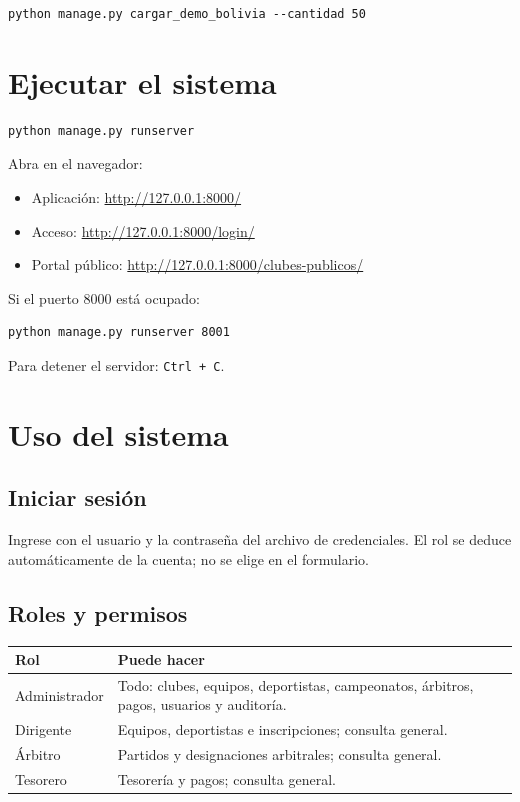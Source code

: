 \documentclass[11pt,a4paper]{article}
\newcommand{\campo}[1]{\texttt{\small #1}}
\begin{document}
\begin{lstlisting}
python manage.py cargar_demo_bolivia --cantidad 50
\end{lstlisting}

\section{Ejecutar el sistema}

\begin{lstlisting}
python manage.py runserver
\end{lstlisting}

Abra en el navegador:

\begin{itemize}[leftmargin=1.4em]
  \item Aplicación: \url{http://127.0.0.1:8000/}
  \item Acceso: \url{http://127.0.0.1:8000/login/}
  \item Portal público: \url{http://127.0.0.1:8000/clubes-publicos/}
\end{itemize}

Si el puerto 8000 está ocupado:

\begin{lstlisting}
python manage.py runserver 8001
\end{lstlisting}

Para detener el servidor: \campo{Ctrl + C}.

\section{Uso del sistema}

\subsection{Iniciar sesión}

Ingrese con el usuario y la contraseña del archivo de credenciales. El rol se
deduce automáticamente de la cuenta; no se elige en el formulario.

\subsection{Roles y permisos}

\begin{tabularx}{\textwidth}{@{}l X@{}}
\toprule
\textbf{Rol} & \textbf{Puede hacer}\\
\midrule
Administrador & Todo: clubes, equipos, deportistas, campeonatos, árbitros,
pagos, usuarios y auditoría.\\
Dirigente & Equipos, deportistas e inscripciones; consulta general.\\
Árbitro & Partidos y designaciones arbitrales; consulta general.\\
Tesorero & Tesorería y pagos; consulta general.\\
\bottomrule
\end{tabularx}
\end{document}
